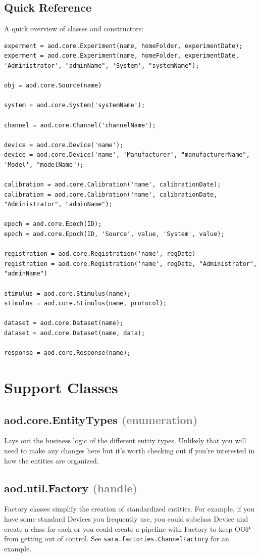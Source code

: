 \documentclass[10pt]{exam}
\newcommand\myparent[1]{\textcolor{gray}{(#1)}}
\newcommand\aodclass[1]{\textcolor{codeblue}{\texttt{#1}}}
\begin{document}
	\subsection{Quick Reference}
		\noindent A quick overview of classes and constructors:
		\begin{lstlisting}[style=matlab-editor, basicstyle=\mlttfamily\footnotesize]
experment = aod.core.Experiment(name, homeFolder, experimentDate);
experment = aod.core.Experiment(name, homeFolder, experimentDate, 'Administrator', "adminName", 'System', "systemName");

obj = aod.core.Source(name)

system = aod.core.System('systemName');

channel = aod.core.Channel('channelName');

device = aod.core.Device('name');
device = aod.core.Device('name', 'Manufacturer', "manufacturerName", 'Model', "modelName");

calibration = aod.core.Calibration('name', calibrationDate);
calibration = aod.core.Calibration('name', calibrationDate, "Administrator", "adminName");

epoch = aod.core.Epoch(ID);
epoch = aod.core.Epoch(ID, 'Source', value, 'System', value);

registration = aod.core.Registration('name', regDate)
registration = aod.core.Registration('name', regDate, "Administrator", "adminName")

stimulus = aod.core.Stimulus(name);
stimulus = aod.core.Stimulus(name, protocol);

dataset = aod.core.Dataset(name);
dataset = aod.core.Dataset(name, data);

response = aod.core.Response(name);
		\end{lstlisting}
	
\section{Support Classes}
	\subsection{aod.core.EntityTypes \myparent{enumeration}}
		\noindent Lays out the business logic of the different entity types. Unlikely that you will need to make any changes here but it's worth checking out if you're interested in how the entities are organized. 
		
	\subsection{aod.util.Factory \textcolor{gray}{(handle)}}
		\noindent Factory classes simplify the creation of standardized entities. For example, if you have some standard Devices you frequently use, you could subclass Device and create a class for each or you could create a pipeline with Factory to keep OOP from getting out of control. See \aodclass{sara.factories.ChannelFactory} for an example. 
		
\end{document}
